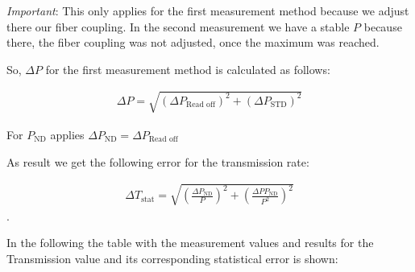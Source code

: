 \textit{Important}: This only applies for the first measurement method because we adjust there our fiber coupling.
In the second measurement we have a stable $P$ because there, the fiber coupling was not adjusted, once the maximum was
reached.

So, $\Delta P$ for the first measurement method is calculated as follows:

\begin{align}
    \Delta P = \sqrt{(\Delta P_{\text{Read off}})^2 + (\Delta P_{\text{STD}})^2}
\end{align}

For $P_{\text{ND}}$ applies $\Delta P_{\text{ND}} = \Delta P_{\text{Read off}}$

As result we get the following error for the transmission rate:

\begin{align}
    \Delta T_{\text{stat}}= \sqrt{\left(\frac{\Delta P_{\text{ND}}}{P}\right)^2 + \left(\frac{\Delta P P_{\text{ND}}}{ P^2}\right)^2}
\end{align}.

In the following the table with the measurement values and results for the Transmission value and its corresponding statistical
error is shown:



